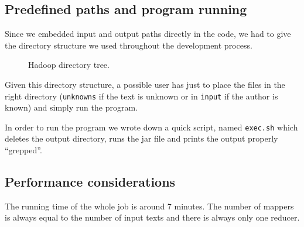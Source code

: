 \documentclass[a4paper,11pt, twoside]{article}
\begin{document}
	\subsection{Predefined paths and program running}
	Since we embedded input and output paths directly in the code, we had to give the directory structure we used throughout the development process. 
	\begin{figure}[h!]
	\caption{Hadoop directory tree.}
	\end{figure}

	\noindent
	Given this directory structure, a possible user has just to place the files in the right directory (\lstinline|unknowns| if the text is unknown or in \lstinline|input| if the author is known) and simply run the program.
	
	\noindent
	In order to run the program we wrote down a quick script, named \lstinline|exec.sh| which deletes the output directory, runs the jar file and prints the output properly ``grepped''.

	\subsection{Performance considerations} %
	The running time of the whole job is around 7 minutes. The number of mappers is always equal to the number of input texts and there is always only one reducer.
	

	\newpage
	\printbibheading
	\printbibliography[nottype=book,heading=subbibliography,title={Online Sources}]
\end{document}
